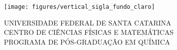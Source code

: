 \frenchspacing                %


\renewcommand{\imprimirorientadorRotulo}{Orientador:}
\renewcommand{\imprimircoorientadorRotulo}{Coorientador:}

\renewcommand{\imprimircapa}{%
	\begin{capa}%
		\begin{center}
			\texttt{[image: figures/vertical\_sigla\_fundo\_claro]}
		\end{center}

		\center
		\ABNTEXchapterfont\large
		UNIVERSIDADE FEDERAL DE SANTA CATARINA \\
		CENTRO DE CIÊNCIAS FÍSICAS E MATEMÁTICAS \\
		PROGRAMA DE PÓS-GRADUAÇÃO EM QUÍMICA

		\vfill

		{\ABNTEXchapterfont\large\imprimirautor}

		\vfill
		\begin{center}
			\ABNTEXchapterfont\bfseries\Large\imprimirtitulo
		\end{center}
		\vfill

		\large\imprimirlocal

		\large\imprimirdata

		\vspace*{1em}
	\end{capa}
}

\imprimircapa{}

